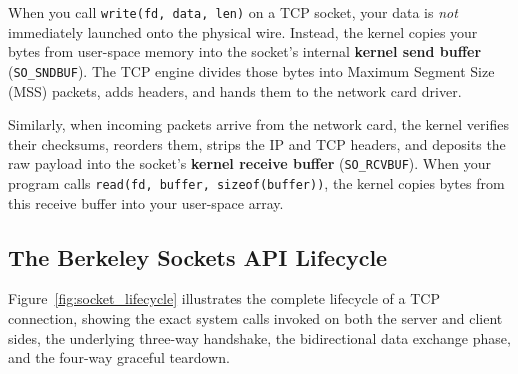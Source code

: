 \begin{underthehood}
When you call \texttt{write(fd, data, len)} on a TCP socket, your data is \textit{not} immediately launched onto the physical wire. Instead, the kernel copies your bytes from user-space memory into the socket's internal \textbf{kernel send buffer} (\texttt{SO\_SNDBUF}). The TCP engine divides those bytes into Maximum Segment Size (MSS) packets, adds headers, and hands them to the network card driver.

Similarly, when incoming packets arrive from the network card, the kernel verifies their checksums, reorders them, strips the IP and TCP headers, and deposits the raw payload into the socket's \textbf{kernel receive buffer} (\texttt{SO\_RCVBUF}). When your program calls \texttt{read(fd, buffer, sizeof(buffer))}, the kernel copies bytes from this receive buffer into your user-space array.
\end{underthehood}

\subsection{The Berkeley Sockets API Lifecycle}

Figure~\ref{fig:socket_lifecycle} illustrates the complete lifecycle of a TCP connection, showing the exact system calls invoked on both the server and client sides, the underlying three-way handshake, the bidirectional data exchange phase, and the four-way graceful teardown.

